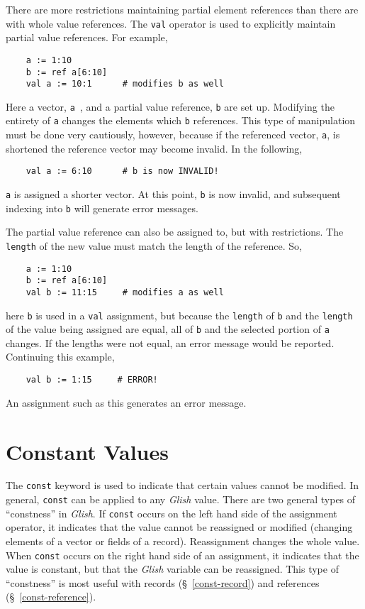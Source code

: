 There are more restrictions maintaining partial element references 
than there are with whole value references. The {\tt val}
operator is used to explicitly maintain partial value references. For 
example,
\begin{verbatim}
    a := 1:10
    b := ref a[6:10]
    val a := 10:1      # modifies b as well
\end{verbatim}
Here a vector, {\tt a }, and a partial value reference, {\tt b} are
set up. Modifying the entirety of {\tt a} changes the elements which
{\tt b} references. This type of manipulation must be done very cautiously, 
however, because if the referenced vector, {\tt a}, is shortened the reference
vector may become invalid. In the following,
\begin{verbatim}
    val a := 6:10      # b is now INVALID!
\end{verbatim}
{\tt a} is assigned a shorter vector. At this point, {\tt b} is now
invalid, and subsequent indexing into {\tt b} will generate  error
messages.

The partial value reference can also be assigned to, but with restrictions.
The {\tt length} of the new value must match the length of the reference.
So,
\begin{verbatim}
    a := 1:10
    b := ref a[6:10]
    val b := 11:15     # modifies a as well
\end{verbatim}
here {\tt b} is used in a {\tt val} assignment, but because the {\tt length}
of {\tt b} and the {\tt length} of the value being assigned are equal, all of
{\tt b} and the selected portion of {\tt a} changes. If the lengths were
not equal, an error message would be  reported. Continuing this example,
\begin{verbatim}
    val b := 1:15     # ERROR!
\end{verbatim}
An assignment such as this generates an error message.


\section{Constant Values}
\label{constant-values}


The {\tt const} keyword  is used to indicate that certain values cannot be
modified. In general, {\tt const} can be applied to any {\em Glish} value. There
are two general types of ``constness'' in {\em Glish}. If {\tt const} occurs on
the left hand side of the assignment operator, it indicates that the value
cannot be reassigned or modified (changing elements of a vector or fields of
a record). Reassignment changes the whole value. When {\tt const} occurs on
the right hand side of an assignment, it
indicates that the value is constant, but that the {\em Glish} variable can be
reassigned. This type of ``constness'' is most useful with records 
(\S~\ref{const-record}) and references (\S~\ref{const-reference}).

